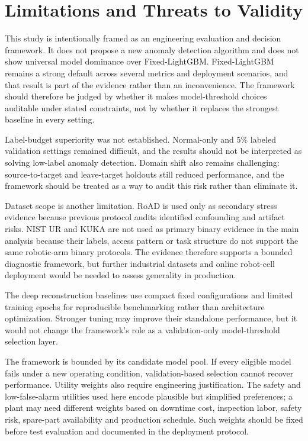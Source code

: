 \section{Limitations and Threats to Validity}

This study is intentionally framed as an engineering evaluation and decision framework. It does not propose a new anomaly detection algorithm and does not show universal model dominance over Fixed-\allowbreak LightGBM. Fixed-\allowbreak LightGBM remains a strong default across several metrics and deployment scenarios, and that result is part of the evidence rather than an inconvenience. The framework should therefore be judged by whether it makes model-threshold choices auditable under stated constraints, not by whether it replaces the strongest baseline in every setting.

Label-budget superiority was not established. Normal-only and 5\% labeled validation settings remained difficult, and the results should not be interpreted as solving low-label anomaly detection. Domain shift also remains challenging: source-to-target and leave-target holdouts still reduced performance, and the framework should be treated as a way to audit this risk rather than eliminate it.

Dataset scope is another limitation. RoAD is used only as secondary stress evidence because previous protocol audits identified confounding and artifact risks. NIST UR and KUKA are not used as primary binary evidence in the main analysis because their labels, access pattern or task structure do not support the same robotic-arm binary protocols. The evidence therefore supports a bounded diagnostic framework, but further industrial datasets and online robot-cell deployment would be needed to assess generality in production.



The deep reconstruction baselines use compact fixed configurations and limited training epochs for reproducible benchmarking rather than architecture optimization. Stronger tuning may improve their standalone performance, but it would not change the framework's role as a validation-only model-threshold selection layer.

The framework is bounded by its candidate model pool. If every eligible model fails under a new operating condition, validation-based selection cannot recover performance. Utility weights also require engineering justification. The safety and low-false-alarm utilities used here encode plausible but simplified preferences; a plant may need different weights based on downtime cost, inspection labor, safety risk, spare-part availability and production schedule. Such weights should be fixed before test evaluation and documented in the deployment protocol.


